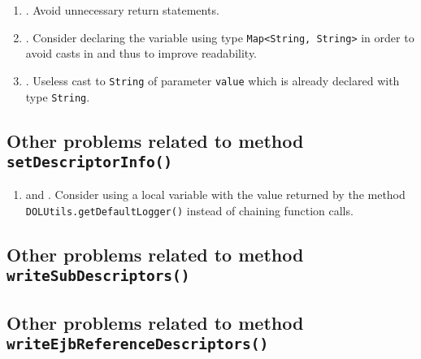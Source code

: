 \begin{enumerate}
	\item {}. Avoid unnecessary return statements.
	\item {}. Consider declaring the variable using type \texttt{Map<String, String>} in order to avoid casts in  and thus to improve readability.
	\item {}. Useless cast to \texttt{String} of parameter \texttt{value} which is already declared with type \texttt{String}.
\end{enumerate}

\subsection{Other problems related to method \texttt{setDescriptorInfo()}}
\begin{enumerate}
	\item {} and . Consider using a local variable with the value returned by the method \texttt{DOLUtils.getDefaultLogger()} instead of chaining function calls.
\end{enumerate}

\subsection{Other problems related to method \texttt{writeSubDescriptors()}}

\subsection{Other problems related to method \texttt{writeEjbReferenceDescriptors()}}